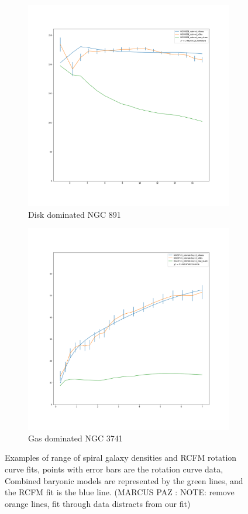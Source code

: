 \documentclass[reprint,%
 amsmath,amssymb,
 aps,
]{revtex4-1}
\begin{document}
\begin{figure}[ht]
    \begin{subfigure}[c]{0.5\linewidth}
    \centering
    \includegraphics[width=0.75\linewidth]{figures/NGC0891_rotmod_XueSofue.png} 
    \caption{Disk dominated NGC 891} 
    \label{fig7:c} 
  \end{subfigure}%
  \begin{subfigure}[c]{0.5\linewidth}
    \centering
    \includegraphics[width=0.75\linewidth]{figures/NGC3741_rotmod-Copy1_XueSofue.png} 
    \caption{Gas dominated NGC 3741} 
    \label{fig7:c} 
  \end{subfigure}%
  \caption{Examples of range of spiral galaxy densities and RCFM rotation curve fits, points with error bars are the rotation curve data, Combined baryonic models are represented by the green lines, and the RCFM fit is the blue line. (MARCUS PAZ : NOTE: remove orange lines, fit through data distracts from our fit)  }
  \label{fig7} 
\end{figure}
 
\end{document}
